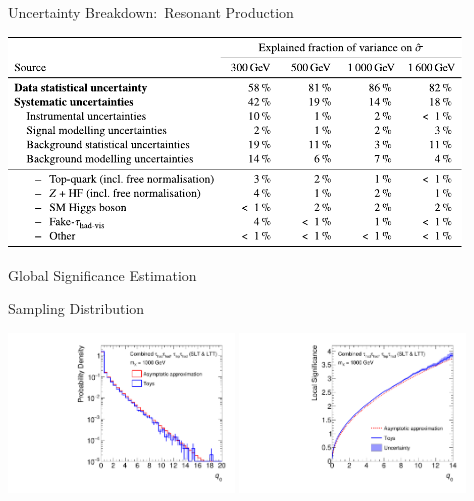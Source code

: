 \documentclass[11pt, xcolor={dvipsnames}, aspectratio=169, notes]{beamer}
\begin{document}

\begin{frame}{Uncertainty Breakdown:\ Resonant  Production}
  \centering

  \includegraphics[width=0.9\textwidth]{backup/uncertainty_breakdown_resonant}
\end{frame}


\begin{frame}[standout]
  Global Significance Estimation
\end{frame}


\begin{frame}{ Sampling Distribution}
  \centering

  \includegraphics[width=0.45\textwidth]{global_significance/local_sig_toys/q0_1000}\hfill%
  \includegraphics[width=0.45\textwidth]{global_significance/local_sig_toys/q0sig_1000}
\end{frame}
\end{document}
